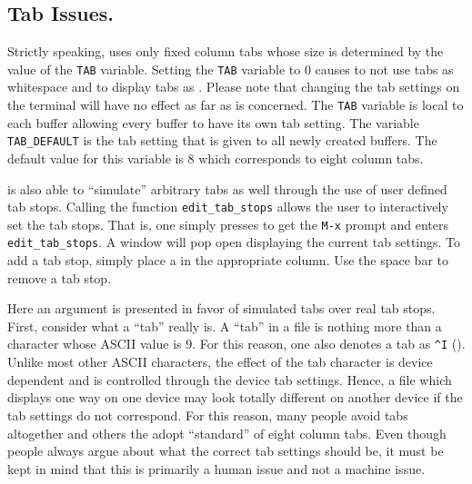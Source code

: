 \subsection{Tab Issues.}

  Strictly speaking, \jed{} uses only fixed column tabs whose size is
  determined by the value of the \verb|TAB| variable. Setting the \verb|TAB|
  variable to 0 causes \jed{} to not use tabs as whitespace and to display
  tabs as . Please note that changing the tab settings on the
  terminal will have no effect as far as \jed{} is concerned.  The
  \verb|TAB| variable is local to each buffer allowing every buffer to have
  its own tab setting.  The variable \verb|TAB_DEFAULT| is the tab setting
  that is given to all newly created buffers.  The default value for this
  variable is 8 which corresponds to eight column tabs.

  \jed{} is also able to ``simulate'' arbitrary tabs as well through the use
  of user defined tab stops.  Calling the function \verb|edit_tab_stops|
  allows the user to interactively set the tab stops.  That is, one simply
  presses  to get the \verb|M-x| prompt and enters
  \verb|edit_tab_stops|. A window will pop open displaying the current tab
  settings.  To add a tab stop, simply place a  in the appropriate
  column.  Use the space bar to remove a tab stop.

  Here an argument is presented in favor of simulated tabs over real tab
  stops. First, consider what a ``tab'' really is.  A ``tab'' in a file is
  nothing more than a character whose ASCII value is 9.  For this reason,
  one also denotes a tab as \verb|^I| ().  Unlike most other
  ASCII characters, the effect of the tab character is device dependent and
  is controlled through the device tab settings.  Hence, a file which
  displays one way on one device may look totally different on another
  device if the tab settings do not correspond. For this reason, many people
  avoid tabs altogether and others the adopt ``standard'' of eight column
  tabs.  Even though people always argue about what the correct tab settings
  should be, it must be kept in mind that this is primarily a human issue
  and not a machine issue.

